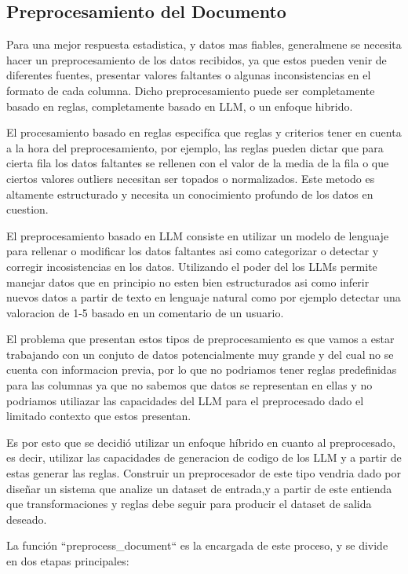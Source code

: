 \subsection{Preprocesamiento del Documento}

Para una mejor respuesta estadistica, y datos mas fiables, generalmene se necesita hacer un preprocesamiento de los datos recibidos, ya que estos pueden venir de diferentes fuentes, presentar valores faltantes o algunas inconsistencias en el formato de cada columna. Dicho preprocesamiento puede ser completamente basado en reglas, completamente basado en LLM, o un enfoque hibrido.

El procesamiento basado en reglas especifíca que reglas y criterios tener en cuenta a la hora del preprocesamiento, por ejemplo, las reglas pueden dictar que para cierta fila los datos faltantes se rellenen con el valor de la media de la fila o que ciertos valores outliers necesitan ser topados o normalizados. Este metodo es altamente estructurado y necesita un conocimiento profundo de los datos en cuestion.

El preprocesamiento basado en LLM consiste en utilizar un modelo de lenguaje para rellenar o modificar los datos faltantes asi como categorizar o detectar y corregir incosistencias en los datos. Utilizando el poder del los LLMs permite manejar datos que en principio no esten bien estructurados asi como inferir nuevos datos a partir de texto en lenguaje natural como por ejemplo detectar una valoracion de 1-5 basado en un comentario de un usuario.

El problema que presentan estos tipos de preprocesamiento es que vamos a estar trabajando con un conjuto de datos potencialmente muy grande y del cual no se cuenta con informacion previa, por lo que no podriamos tener reglas predefinidas para las columnas ya que no sabemos que datos se representan en ellas y no podriamos utiliazar las capacidades del LLM para el preprocesado dado el limitado contexto que estos presentan.

Es por esto que se decidió utilizar un enfoque híbrido en cuanto al preprocesado, es decir, utilizar las capacidades de generacion de codigo de los LLM y a partir de estas generar las reglas. Construir un preprocesador de este tipo vendria dado por diseñar un sistema que analize un dataset de entrada,y a partir de este entienda que transformaciones y reglas debe seguir para producir el dataset de salida deseado.

La función ``preprocess\_document`` es la encargada de este proceso, y se divide en dos etapas principales:

